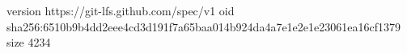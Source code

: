 version https://git-lfs.github.com/spec/v1
oid sha256:6510b9b4dd2eee4cd3d191f7a65baa014b924da4a7e1e2e1e23061ea16cf1379
size 4234
